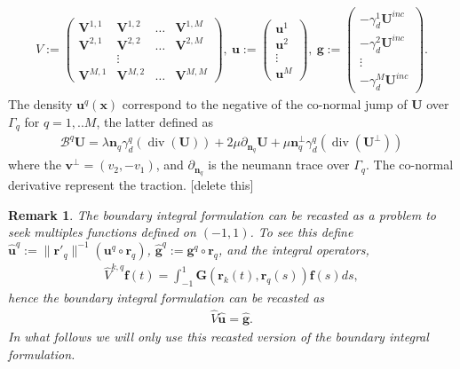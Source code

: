 \documentclass{article}
\newtheorem{remark}[theorem]{Remark}
\newcommand{\vx}{\bm{x}}
\renewcommand{\div}{\operatorname{div}}
\newcommand{\todo}[1]{{\color{red}[#1]}}
\renewcommand{\div}{{\rm div}}
\renewcommand{\div}{\operatorname{div}}
\begin{document}
\begin{align*}
V := \left(
\begin{matrix}
 \mathbf{V}^{1,1} &\mathbf{V}^{1,2}& \hdots& \mathbf{V}^{1,M}\\
\mathbf{V}^{2,1} &\mathbf{V}^{2,2}& \hdots& \mathbf{V}^{2,M}\\
 & \vdots & \\
\mathbf{V}^{M,1} &\mathbf{V}^{M,2}& \hdots& \mathbf{V}^{M,M}
\end{matrix}
\right), \
\mathbf{u} := 
\left(
\begin{matrix}\mathbf{u}^1 \\
\mathbf{u}^2 \\
\vdots \\
\mathbf{u}^M \end{matrix}
\right), \ 
\mathbf{g} := 
\left(
\begin{matrix}
 -\gamma^1_d \mathbf{U}^{inc} \\
 -\gamma^2_d \mathbf{U}^{inc}\\
\vdots \\
 -\gamma^M_d \mathbf{U}^{inc} \end{matrix}
\right).
\end{align*}
The density $\mathbf{u}^q(\vx)$ correspond to the negative of the co-normal jump of $\mathbf{U}$ over $\Gamma_q$ for $q =1,..M$,  the latter defined as
\begin{align*}
\mathcal{B}^q \mathbf{U} =
\lambda \mathbf{n}_q \gamma_d^q(\div(\mathbf{U}))
+ 2 \mu \partial_{\mathbf{n}_q} \mathbf{U}+
\mu \mathbf{n}_q^\perp \gamma_d^q(\div(\mathbf{U}^\perp))
\end{align*}
where the $\mathbf{v}^\perp  = (v_2,-v_1)$, and $\partial_{\mathbf{n}_q}$ is the neumann trace over $\Gamma_q$.  The co-normal derivative represent the traction. 
\todo{delete this}

\begin{remark}
The boundary integral formulation can be recasted as a problem to seek multiples functions defined on $(-1,1)$. To see this define $\widehat{\mathbf{u}}^q := \| \mathbf{r'}_q \|^{-1} (\mathbf{u}^q \circ \mathbf{r}_q)$, $\widehat{\mathbf{g}}^q :=\mathbf{g}^q \circ \mathbf{r}_q$, and the integral operators, 
\begin{align*}
\widehat{V}^{k,q} \mathbf{f} (t) = 
\int_{-1}^1 \mathbf{G}(\mathbf{r}_k(t), \mathbf{r}_q(s)) \mathbf{f}(s) ds ,
\end{align*}
hence the boundary integral formulation can be recasted as 
\begin{align}
\label{eq:harform}
\widehat{V} \widehat{\mathbf{u}} = \widehat{\mathbf{g}}.
\end{align}
In what follows we will only use this recasted version of the boundary integral formulation. 
\end{remark}
\end{document}
